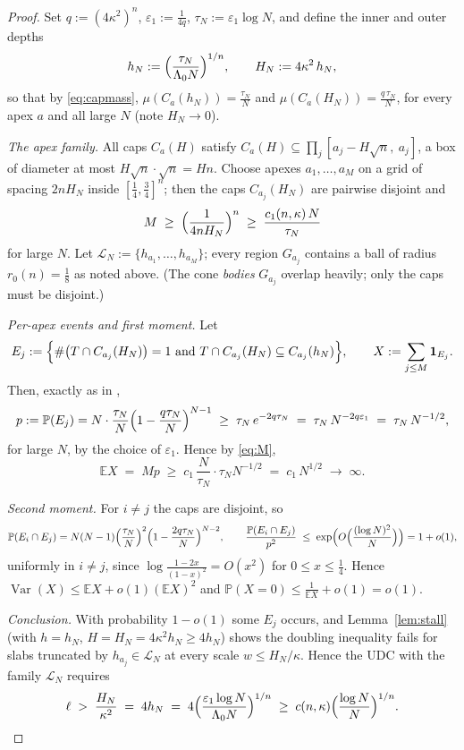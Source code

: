 \documentclass[11pt]{article}
\newcommand{\E}{\mathbb{E}}
\newcommand{\PP}{\mathbb{P}}
\begin{document}
\begin{proof}
Set $q:=(4\kappa^2)^n$,
$\varepsilon_1:=\frac{1}{4q}$, $\tau_N:=\varepsilon_1\log N$, and define the
inner and outer depths
\[
h_N:=\Bigl(\frac{\tau_N}{\Lambda_0N}\Bigr)^{1/n},
\qquad
H_N:=4\kappa^2\,h_N,
\]
so that by \eqref{eq:capmass},
$\mu(C_a(h_N))=\frac{\tau_N}N$ and $\mu(C_a(H_N))=\frac{q\,\tau_N}{N}$, for
every apex $a$ and all large $N$ (note $H_N\to0$).

\emph{The apex family.}  All caps $C_a(H)$ satisfy
$C_a(H)\subseteq\prod_j[a_j-H\sqrt n,\ a_j]$, a box of diameter at most
$H\sqrt n\cdot\sqrt n=Hn$.  Choose apexes $a_1,\dots,a_M$ on a grid of spacing
$2nH_N$ inside $[\tfrac14,\tfrac34]^n$; then the caps
$C_{a_j}(H_N)$ are pairwise disjoint and
\begin{equation}\label{eq:M}
M\;\ge\;\Bigl(\frac{1}{4nH_N}\Bigr)^{n}
\;\ge\;\frac{c_1(n,\kappa)\,N}{\tau_N}
\end{equation}
for large $N$.  Let $\mathcal L_N:=\{h_{a_1},\dots,h_{a_M}\}$; every region
$G_{a_j}$ contains a ball of radius $r_0(n)=\frac18$ as noted above.  (The
cone \emph{bodies} $G_{a_j}$ overlap heavily; only the caps must be disjoint.)

\emph{Per-apex events and first moment.}  Let
\[
E_j:=\Bigl\{\#\bigl(T\cap C_{a_j}(H_N)\bigr)=1
\ \text{and}\ T\cap C_{a_j}(H_N)\subseteq C_{a_j}(h_N)\Bigr\},
\qquad
X:=\sum_{j\le M}\mathbf 1_{E_j}.
\]
Then, exactly as in \cite{companion4},
\[
p:=\PP(E_j)=N\cdot\frac{\tau_N}{N}\Bigl(1-\frac{q\tau_N}{N}\Bigr)^{N-1}
\;\ge\;\tau_N\,e^{-2q\tau_N}
\;=\;\tau_N\,N^{-2q\varepsilon_1}
\;=\;\tau_N\,N^{-1/2},
\]
for large $N$, by the choice of $\varepsilon_1$.  Hence by \eqref{eq:M},
\[
\E X\;=\;Mp\;\ge\;c_1\,\frac{N}{\tau_N}\cdot\tau_N N^{-1/2}
\;=\;c_1\,N^{1/2}\;\longrightarrow\;\infty .
\]

\emph{Second moment.}  For $i\ne j$ the caps are disjoint, so
\[
\PP(E_i\cap E_j)
=N(N-1)\Bigl(\frac{\tau_N}N\Bigr)^2
\Bigl(1-\frac{2q\tau_N}{N}\Bigr)^{N-2},
\qquad
\frac{\PP(E_i\cap E_j)}{p^2}
\;\le\;\exp\Bigl(O\Bigl(\frac{(\log N)^2}{N}\Bigr)\Bigr)=1+o(1),
\]
uniformly in $i\ne j$, since
$\log\frac{1-2x}{(1-x)^2}=O(x^2)$ for $0\le x\le\frac14$.  Hence
$\operatorname{Var}(X)\le\E X+o(1)(\E X)^2$ and
$\PP(X=0)\le\frac1{\E X}+o(1)=o(1)$.

\emph{Conclusion.}  With probability $1-o(1)$ some $E_j$ occurs, and
Lemma~\ref{lem:stall} (with $h=h_N$, $H=H_N=4\kappa^2h_N\ge4h_N$) shows the
doubling inequality fails for slabs truncated by $h_{a_j}\in\mathcal L_N$ at
every scale $w\le H_N/\kappa$.  Hence the UDC with the family $\mathcal L_N$
requires
\[
\ell\;>\;\frac{H_N}{\kappa^2}\;=\;4h_N
\;=\;4\Bigl(\frac{\varepsilon_1\log N}{\Lambda_0N}\Bigr)^{1/n}
\;\ge\;c(n,\kappa)\Bigl(\frac{\log N}{N}\Bigr)^{1/n}.
\]
\end{proof}
\end{document}
